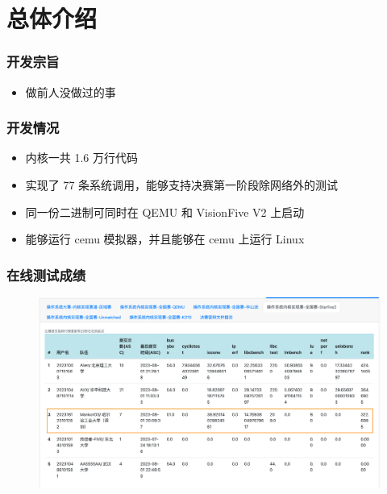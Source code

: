 \section{总体介绍}

\begin{frame}
    \frametitle{开发宗旨}

    \begin{itemize}
        \item 做前人没做过的事
    \end{itemize}

\end{frame}

\begin{frame}
    \frametitle{开发情况}

    \begin{itemize}
        \item 内核一共 1.6 万行代码
        \item 实现了 77 条系统调用，能够支持决赛第一阶段除网络外的测试
        \item 同一份二进制可同时在 QEMU 和 VisionFive V2 上启动
        \item 能够运行 cemu 模拟器，并且能够在 cemu 上运行 Linux
    \end{itemize}

\end{frame}

\begin{frame}
    \frametitle{在线测试成绩}
    \begin{figure}
        \centering
        \includegraphics[width=.7\textwidth]{assets/rank.png}
    \end{figure}

\end{frame}
